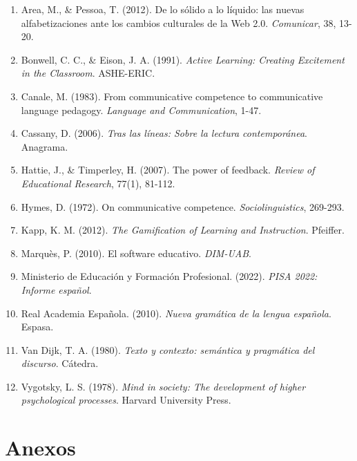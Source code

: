 \documentclass[12pt,spanish]{article}
\begin{document}
\begin{enumerate}
    \item Area, M., \& Pessoa, T. (2012). De lo sólido a lo líquido: las nuevas alfabetizaciones ante los cambios culturales de la Web 2.0. \textit{Comunicar}, 38, 13-20.

    \item Bonwell, C. C., \& Eison, J. A. (1991). \textit{Active Learning: Creating Excitement in the Classroom}. ASHE-ERIC.

    \item Canale, M. (1983). From communicative competence to communicative language pedagogy. \textit{Language and Communication}, 1-47.

    \item Cassany, D. (2006). \textit{Tras las líneas: Sobre la lectura contemporánea}. Anagrama.

    \item Hattie, J., \& Timperley, H. (2007). The power of feedback. \textit{Review of Educational Research}, 77(1), 81-112.

    \item Hymes, D. (1972). On communicative competence. \textit{Sociolinguistics}, 269-293.

    \item Kapp, K. M. (2012). \textit{The Gamification of Learning and Instruction}. Pfeiffer.

    \item Marquès, P. (2010). El software educativo. \textit{DIM-UAB}.

    \item Ministerio de Educación y Formación Profesional. (2022). \textit{PISA 2022: Informe español}.

    \item Real Academia Española. (2010). \textit{Nueva gramática de la lengua española}. Espasa.

    \item Van Dijk, T. A. (1980). \textit{Texto y contexto: semántica y pragmática del discurso}. Cátedra.

    \item Vygotsky, L. S. (1978). \textit{Mind in society: The development of higher psychological processes}. Harvard University Press.
\end{enumerate}

\newpage
\section{Anexos}
\end{document}
